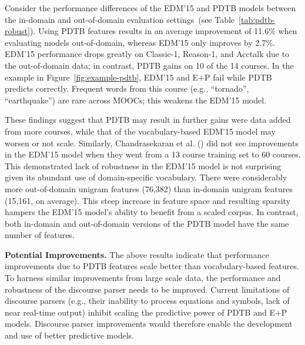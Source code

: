 \documentclass[letterpaper]{article}
\begin{document}
Consider the performance differences of the EDM'15 and PDTB models 
between the in-domain and out-of-domain evaluation 
settings~(see Table~\ref{tab:pdtb-robust}). 
Using PDTB features results in an average improvement of 11.6\% when 
evaluating models out-of-domain, whereas EDM'15 only improves by 2.7\%.
EDM'15 performance drops greatly on {\sc Classic-1}, {\sc Reason-1}, and {\sc 
Acctalk} due to the out-of-domain data; in contrast, PDTB gains on 
10 of the 14 courses. In the example in Figure~\ref{fig:example-pdtb}, EDM'15 
and E+P fail while PDTB predicts correctly. Frequent words from this course 
(e.g., ``tornado'', ``earthquake'') are rare across MOOCs; this weakens the 
EDM'15 model. 

These findings suggest that PDTB may result in further gains were data added 
from more courses, while that of the vocabulary-based EDM'15 model may worsen or 
not scale. Similarly, Chandrasekaran et al. 
(\citeyear{chandrasekaran2015learning}) 
did not see improvements in the EDM'15 model when they went from a 13 course 
training set to 60 courses. This demonstrated lack of robustness in the EDM'15
model is not surprising given its abundant use of domain-specific vocabulary. 
There were considerably more out-of-domain unigram features (76,382) than 
in-domain unigram features (15,161, on average). This steep increase 
in feature space and resulting sparsity hampers the EDM'15 model's ability to 
benefit from a scaled corpus. In contrast, both in-domain and out-of-domain 
versions of the PDTB model have the same number of features.

\textbf{Potential Improvements.} The above results indicate that performance 
improvements due to PDTB features scale better than vocabulary-based features.
To harness similar improvements from large scale data, the performance and 
robustness of the discourse parser needs to be improved. Current limitations 
of discourse parsers (e.g., their inability to process equations and symbols, 
lack of near real-time output) inhibit scaling the predictive power of PDTB 
and E+P models. Discourse parser improvements would therefore enable the 
development and use of better predictive models.
\end{document}
